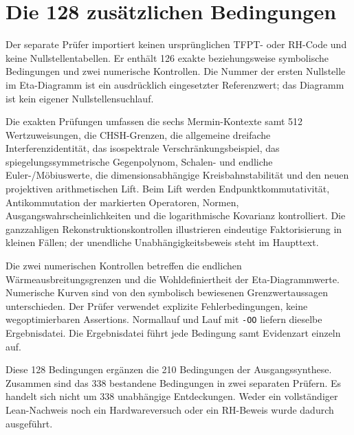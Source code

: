 \section{Die 128 zusätzlichen Bedingungen}
Der separate Prüfer  importiert keinen ursprünglichen TFPT- oder RH-Code und keine Nullstellentabellen. Er enthält 126 exakte beziehungsweise symbolische Bedingungen und zwei numerische Kontrollen. Die Nummer der ersten Nullstelle im Eta-Diagramm ist ein ausdrücklich eingesetzter Referenzwert; das Diagramm ist kein eigener Nullstellensuchlauf.

Die exakten Prüfungen umfassen die sechs Mermin-Kontexte samt 512 Wertzuweisungen, die CHSH-Grenzen, die allgemeine dreifache Interferenzidentität, das isospektrale Verschränkungsbeispiel, das spiegelungssymmetrische Gegenpolynom, Schalen- und endliche Euler-/Möbiuswerte, die dimensionsabhängige Kreisbahnstabilität und den neuen projektiven arithmetischen Lift. Beim Lift werden Endpunktkommutativität, Antikommutation der markierten Operatoren, Normen, Ausgangswahrscheinlichkeiten und die logarithmische Kovarianz kontrolliert. Die ganzzahligen Rekonstruktionskontrollen illustrieren eindeutige Faktorisierung in kleinen Fällen; der unendliche Unabhängigkeitsbeweis steht im Haupttext.

Die zwei numerischen Kontrollen betreffen die endlichen Wärmeausbreitungsgrenzen und die Wohldefiniertheit der Eta-Diagrammwerte. Numerische Kurven sind von den symbolisch bewiesenen Grenzwertaussagen unterschieden. Der Prüfer verwendet explizite Fehlerbedingungen, keine wegoptimierbaren Assertions. Normallauf und Lauf mit \texttt{-OO} liefern dieselbe Ergebnisdatei. Die Ergebnisdatei  führt jede Bedingung samt Evidenzart einzeln auf.

Diese 128 Bedingungen ergänzen die 210 Bedingungen der Ausgangssynthese. Zusammen sind das 338 bestandene Bedingungen in zwei separaten Prüfern. Es handelt sich nicht um 338 unabhängige Entdeckungen. Weder ein vollständiger Lean-Nachweis noch ein Hardwareversuch oder ein RH-Beweis wurde dadurch ausgeführt.

